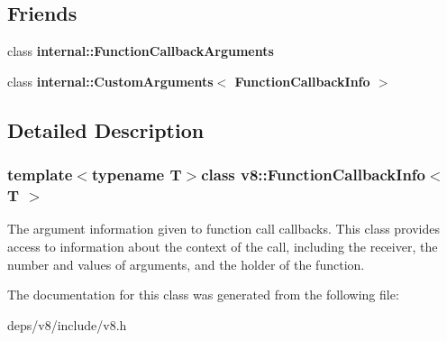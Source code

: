 \subsection*{Friends}
\begin{DoxyCompactItemize}
\item 
\hypertarget{classv8_1_1_function_callback_info_aac7268b20857fd75b69b86ded46d0f34}{}class {\bfseries internal\+::\+Function\+Callback\+Arguments}\label{classv8_1_1_function_callback_info_aac7268b20857fd75b69b86ded46d0f34}

\item 
\hypertarget{classv8_1_1_function_callback_info_a02d869d89b14ddd1717429c2106f955a}{}class {\bfseries internal\+::\+Custom\+Arguments$<$ Function\+Callback\+Info $>$}\label{classv8_1_1_function_callback_info_a02d869d89b14ddd1717429c2106f955a}

\end{DoxyCompactItemize}


\subsection{Detailed Description}
\subsubsection*{template$<$typename T$>$class v8\+::\+Function\+Callback\+Info$<$ T $>$}

The argument information given to function call callbacks. This class provides access to information about the context of the call, including the receiver, the number and values of arguments, and the holder of the function. 

The documentation for this class was generated from the following file\+:\begin{DoxyCompactItemize}
\item 
deps/v8/include/v8.\+h\end{DoxyCompactItemize}
